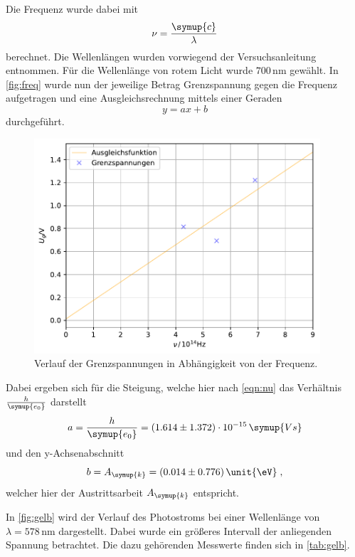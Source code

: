 Die Frequenz wurde dabei mit
\begin{equation*}
    \nu = \frac{\symup{c}}{\lambda}
\end{equation*}
berechnet. Die Wellenlängen wurden vorwiegend der Versuchsanleitung \cite{ap500} entnommen. Für die Wellenlänge von rotem Licht wurde 
$700\,\unit{\nm}$ \cite{rot} gewählt.
In \autoref{fig:freq} wurde nun der jeweilige Betrag Grenzspannung gegen die Frequenz aufgetragen und eine Ausgleichsrechnung mittels einer Geraden 
\begin{equation*}
    y = ax+b
\end{equation*}
durchgeführt.
\begin{figure}
    \centering
    \includegraphics[height = 8cm]{build/frequenz.pdf}
    \caption{Verlauf der Grenzspannungen in Abhängigkeit von der Frequenz.}
    \label{fig:freq}
\end{figure}
Dabei ergeben sich für die Steigung, welche hier nach \autoref{eqn:nu} das Verhältnis $\frac{h}{\symup{e_0}}$ darstellt 
\begin{equation*}
    a = \frac{h}{\symup{e_0}} = (1.614 \pm 1.372) \cdot 10^{-15} \,\symup{Vs}
\end{equation*}
und den y-Achsenabschnitt
\begin{equation*}
    b = A_{\symup{k}} = (0.014 \pm 0.776) \,\unit{\eV} \; ,
\end{equation*}
welcher hier der Austrittsarbeit $A_{\symup{k}}$ entspricht.




In \autoref{fig:gelb} wird der Verlauf des Photostroms bei einer Wellenlänge von $\lambda = 578 \,\unit{\nm}$ dargestellt. Dabei wurde ein größeres 
Intervall der anliegenden Spannung betrachtet. Die dazu gehörenden Messwerte finden sich in \autoref{tab:gelb}.

